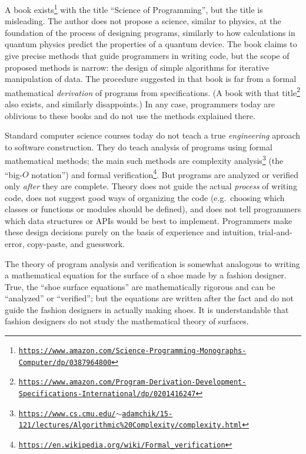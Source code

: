 A book exists\footnote{\texttt{\href{https://www.amazon.com/Science-Programming-Monographs-Computer/dp/0387964800}{https://www.amazon.com/Science-Programming-Monographs-Computer/dp/0387964800}}}
with the title ``Science of Programming'', but the title is misleading.
The author does not propose a science, similar to physics, at the
foundation of the process of designing programs, similarly to how
calculations in quantum physics predict the properties of a quantum
device. The book claims to give precise methods that guide programmers
in writing code, but the scope of proposed methods is narrow: the
design of simple algorithms for iterative manipulation of data. The
procedure suggested in that book is far from a formal mathematical
\emph{derivation} of programs from specifications. (A book with that
title\footnote{\texttt{\href{https://www.amazon.com/Program-Derivation-Development-Specifications-International/dp/0201416247}{https://www.amazon.com/Program-Derivation-Development-Specifications-International/dp/0201416247}}}
also exists, and similarly disappoints.) In any case, programmers
today are oblivious to these books and do not use the methods explained
there.

Standard computer science courses today do not teach a true \emph{engineering}
aproach to software construction. They do teach analysis of programs
using formal mathematical methods; the main such methods are complexity
analysis\footnote{\texttt{\href{https://www.cs.cmu.edu/~adamchik/15-121/lectures/Algorithmic\%20Complexity/complexity.html}{https://www.cs.cmu.edu/$\sim$adamchik/15-121/lectures/Algorithmic\%20Complexity/complexity.html}}}
(the ``big-$O$ notation'') and formal verification\footnote{\texttt{\href{https://en.wikipedia.org/wiki/Formal_verification}{https://en.wikipedia.org/wiki/Formal\_verification}}}.
But programs are analyzed or verified only \emph{after} they are complete.
Theory does not guide the actual \emph{process} of writing code, does
not suggest good ways of organizing the code (e.g.~choosing which
classes or functions or modules should be defined), and does not tell
programmers which data structures or APIs would be best to implement.
Programmers make these design decisions purely on the basis of experience
and intuition, trial-and-error, copy-paste, and guesswork. 

The theory of program analysis and verification is somewhat analogous
to writing a mathematical equation for the surface of a shoe made
by a fashion designer. True, the ``shoe surface equations'' are
mathematically rigorous and can be ``analyzed'' or ``verified'';
but the equations are written after the fact and do not guide the
fashion designers in actually making shoes. It is understandable that
fashion designers do not study the mathematical theory of surfaces.

